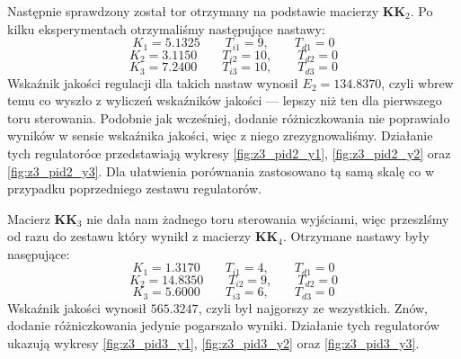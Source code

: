 Następnie sprawdzony został tor otrzymany na podstawie macierzy $\bm{KK}_2$.
Po kilku eksperymentach otrzymaliśmy następujące nastawy:
\begin{equation}
  K_1 = \num{5,1325} \qquad T_{i1} = 9, \qquad T_{d1} = 0 \nonumber
\end{equation}
\begin{equation}
  K_2 = \num{3,1150} \qquad T_{i2} = 10, \qquad T_{d2} = 0
\end{equation}
\begin{equation}
  K_3 = \num{7,2400} \qquad T_{i3} = 10, \qquad T_{d3} = 0 \nonumber
\end{equation}
Wskaźnik jakości regulacji dla takich nastaw wynosił $E_2 = \num{134,8370}$, czyli
wbrew temu co wyszło z wyliczeń wskaźników jakości --- lepszy niż ten dla pierwszego
toru sterowania. Podobnie jak wcześniej, dodanie różniczkowania nie poprawiało
wyników w sensie wskaźnika jakości, więc z niego zrezygnowaliśmy. Działanie
tych regulatoróœ przedstawiają wykresy \ref{fig:z3_pid2_y1},
\ref{fig:z3_pid2_y2} oraz \ref{fig:z3_pid2_y3}. Dla ułatwienia porównania zastosowano
tą samą skalę co w przypadku poprzedniego zestawu regulatorów.


Macierz $\bm{KK}_3$ nie dała nam żadnego toru sterowania wyjściami, więc przeszlśmy
od razu do zestawu który wynikł z macierzy $\bm{KK}_4$. Otrzymane nastawy
były nasępujące:
\begin{equation}
  K_1 = \num{1,3170} \qquad T_{i1} = 4, \qquad T_{d1} = 0 \nonumber
\end{equation}
\begin{equation}
  K_2 = \num{14,8350} \qquad T_{i2} = 9, \qquad T_{d2} = 0
\end{equation}
\begin{equation}
  K_3 = \num{5,6000} \qquad T_{i3} = 6, \qquad T_{d3} = 0 \nonumber
\end{equation}
Wskaźnik jakości wynosił $\num{565,3247}$, czyli był najgorszy ze wszystkich.
Znów, dodanie różniczkowania jedynie pogarszało wyniki. Działanie tych
regulatorów ukazują wykresy \ref{fig:z3_pid3_y1},
\ref{fig:z3_pid3_y2} oraz \ref{fig:z3_pid3_y3}.

